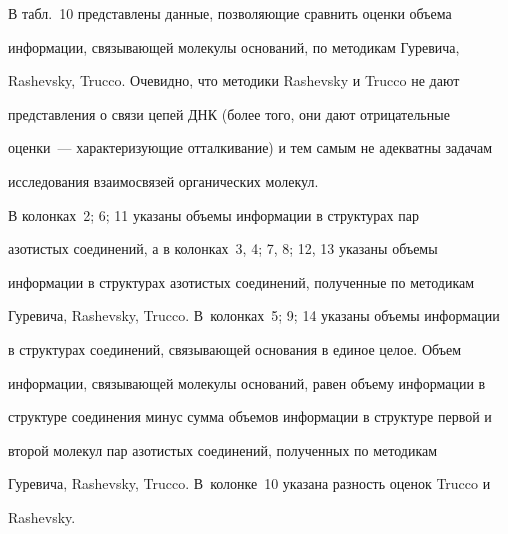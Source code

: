      В табл.~10 представлены данные, позволяющие сравнить оценки объема 


информации, связывающей молекулы оснований, по методикам Гуревича, 


Rashevsky, Trucco. Очевидно, что методики Rashevsky и Trucco не дают 


представления о связи цепей ДНК (более того, они дают отрицательные 


оценки~--- характеризующие отталкивание) и тем самым не адекватны задачам 


исследования взаимосвязей органических молекул.


     


     В колонках~2; 6; 11 указаны объемы информации в структурах пар 


азотистых соединений, а в колонках~3, 4; 7, 8; 12, 13 указаны объемы 


информации в структурах азотистых соединений, полученные по методикам 


Гуревича, Rashevsky, Trucco. В~колонках~5; 9; 14 указаны объемы информации 


в структурах соединений, связывающей основания в единое целое. Объем 


информации, связывающей молекулы оснований, равен объему информации в 


структуре соединения минус сумма объемов информации в структуре первой и 


второй молекул пар азотистых соединений, полученных по методикам 


Гуревича, Rashevsky, Trucco. В~колонке~10 указана разность оценок Trucco и 


Rashevsky.



















